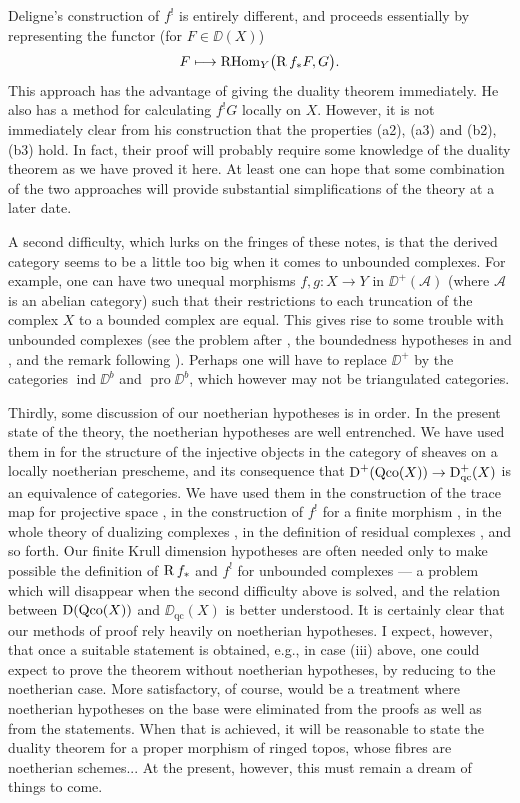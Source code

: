 Deligne's construction of $f^{!}$ is entirely different, and proceeds essentially by representing the functor (for $F\in \DD(X)$)
\[
F\longmapsto \operatorname{RHom}_{Y}\bigl(\operatorname{R} f_{*}F,G\bigr).
\]
This approach has the advantage of giving the duality theorem immediately. He also has a method for calculating $f^{!}G$ locally on $X$. However, it is not immediately clear from his construction that the properties (a2), (a3) and (b2), (b3) hold. In fact, their proof will probably require some knowledge of the duality theorem as we have proved it here. At least one can hope that some combination of the two approaches will provide substantial simplifications of the theory at a later date.

A second difficulty, which lurks on the fringes of these notes, is that the derived category seems to be a little too big when it comes to unbounded complexes. For example, one can have two unequal morphisms $f,g\colon X\to Y$ in $\DD^{+}(\mathcal{A})$ (where $\mathcal{A}$ is an abelian category) such that their restrictions to each truncation of the complex $X$ to a bounded complex are equal. This gives rise to some trouble with unbounded complexes (see the problem after , the boundedness hypotheses in  and , and the remark following ). Perhaps one will have to replace $\DD^{+}$ by the categories $\operatorname{ind}\DD^{b}$ and $\operatorname{pro}\DD^{b}$, which however may not be triangulated categories.

Thirdly, some discussion of our noetherian hypotheses is in order. In the present state of the theory, the noetherian hypotheses are well entrenched. We have used them in  for the structure of the injective objects in the category of sheaves on a locally noetherian prescheme, and its consequence that $\operatorname{D}^{+}(\operatorname{Qco}(X))\to \operatorname{D}_{\mathrm{qc}}^{+}(X)$ is an equivalence of categories. We have used them in the construction of the trace map for projective space , in the construction of $f^{!}$ for a finite morphism , in the whole theory of dualizing complexes , in the definition of residual complexes , and so forth. Our finite Krull dimension hypotheses are often needed only to make possible the definition of $\operatorname{R} f_{*}$ and $f^{!}$ for unbounded complexes --- a problem which will disappear when the second difficulty above is solved, and the relation between $\operatorname{D}(\operatorname{Qco}(X))$ and $\DD_{\mathrm{qc}}(X)$ is better understood. It is certainly clear that our methods of proof rely heavily on noetherian hypotheses. I expect, however, that once a suitable statement is obtained, e.g., in case (iii) above, one could expect to prove the theorem without noetherian hypotheses, by reducing to the noetherian case. More satisfactory, of course, would be a treatment where noetherian hypotheses on the base were eliminated from the proofs as well as from the statements. When that is achieved, it will be reasonable to state the duality theorem for a proper morphism of ringed topos, whose fibres are noetherian schemes... At the present, however, this must remain a dream of things to come.

